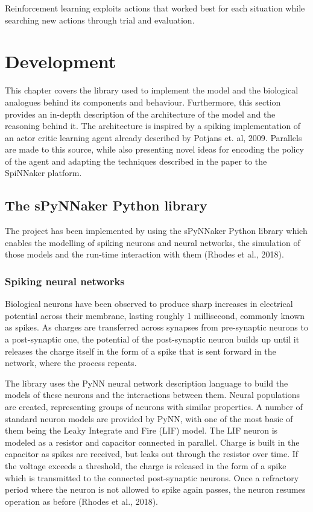 \documentclass[10pt]{article}
\begin{document}
    Reinforcement learning exploits actions that worked best for each situation while searching new actions through trial and evaluation.
    
    \section{Development}

    This chapter covers the library used to implement the model and the biological analogues behind its components and behaviour. Furthermore, this section provides an in-depth description of the architecture of the model and the reasoning behind it. The architecture is inspired by a spiking implementation of an actor critic learning agent already described by Potjans et. al, 2009. Parallels are made to this source, while also presenting novel ideas for encoding the policy of the agent and adapting the techniques described in the paper to the SpiNNaker platform.

    \subsection{The sPyNNaker Python library}

    The project has been implemented by using the sPyNNaker Python library which enables the modelling of spiking neurons and neural networks, the simulation of those models and the run-time interaction with them (Rhodes et al., 2018).

    \subsubsection{Spiking neural networks}

    Biological neurons have been observed to produce sharp increases in electrical potential across their membrane, lasting roughly 1 millisecond, commonly known as spikes. As charges are transferred across synapses from pre-synaptic neurons to a post-synaptic one, the potential of the post-synaptic neuron builds up until it releases the charge itself in the form of a spike that is sent forward in the network, where the process repeats.

    The library uses the PyNN neural network description language to build the models of these neurons and the interactions between them. Neural populations are created, representing groups of neurons with similar properties. A number of standard neuron models are provided by PyNN, with one of the most basic of them being the Leaky Integrate and Fire (LIF) model. The LIF neuron is modeled as a resistor and capacitor connected in parallel. Charge is built in the capacitor as spikes are received, but leaks out through the resistor over time. If the voltage exceeds a threshold, the charge is released in the form of a spike which is transmitted to the connected post-synaptic neurons. Once a refractory period where the neuron is not allowed to spike again passes, the neuron resumes operation as before (Rhodes et al., 2018). 
    
\end{document}

